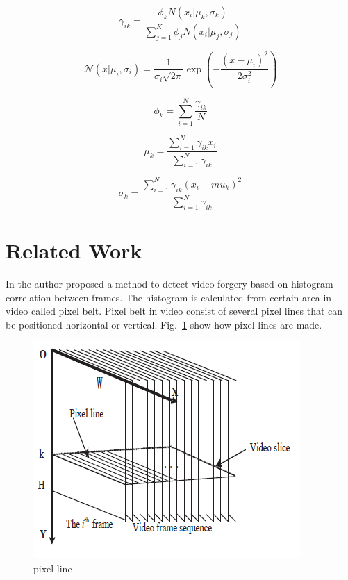 \documentclass[conference]{IEEEtran}
\begin{document}
\begin{equation}
\gamma_{ik} = \frac{\phi_k N(x_i|\mu_k,\sigma_k)}{\sum_{j=1}^{K}{\phi_j N(x_i|\mu_j,\sigma_j)}}
\label{gmmeq}
\end{equation}

\begin{equation}
\mathcal{N}(x | \mu_i, \sigma_i) = \frac{1}{\sigma_i\sqrt{2\pi}} \exp\left(-\frac{(x-\mu_i)^2}{2\sigma_i^2}\right)
\label{normeq}
\end{equation}

\begin{equation}
\phi_k = \sum_{i=1}^N{\frac{\gamma_{ik}}{N}}
\label{weightnew}
\end{equation}

\begin{equation}
\mu_k = \frac{\sum_{i=1}^N\gamma_{ik} x_i}{\sum_{i=1}^N\gamma_{ik}}
\label{meannew}
\end{equation}

\begin{equation}
\sigma_k = \frac{\sum_{i=1}^N\gamma_{ik} {(x_i-mu_k)}^2}{\sum_{i=1}^N\gamma_{ik}}
\label{covnew}
\end{equation}

\section{Related Work}
In \cite{b2} the author proposed a method to detect video forgery based on histogram correlation between frames. The histogram is calculated from certain area in video called pixel belt. Pixel belt in video consist of several pixel lines that can be positioned horizontal or vertical. Fig.~\ref{fig1} show how pixel lines are made.
\begin{figure}[htbp]
\centerline{\includegraphics{pixelline.PNG}}
\caption{pixel line}
\label{fig1}
\end{figure}
\end{document}
